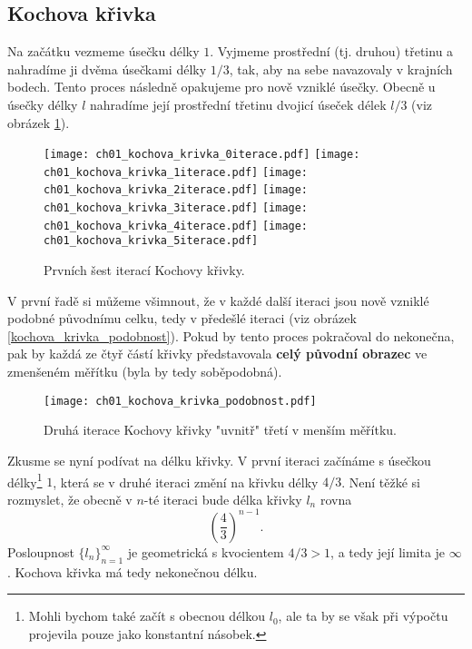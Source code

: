 \subsection{Kochova křivka}\label{subsec:kochova_krivka}
Na začátku vezmeme úsečku délky $1$. Vyjmeme prostřední (tj. druhou) třetinu a nahradíme ji dvěma úsečkami délky $1/3$, tak, aby na sebe navazovaly v krajních bodech. Tento proces následně opakujeme pro nově vzniklé úsečky. Obecně u úsečky délky $l$ nahradíme její prostřední třetinu dvojicí úseček délek $l/3$ (viz obrázek \ref{fig:kochova_krivka_6iteraci}).
\begin{figure}[h]
    \centering
    \texttt{[image: ch01\_kochova\_krivka\_0iterace.pdf]}\qquad
    \texttt{[image: ch01\_kochova\_krivka\_1iterace.pdf]}\qquad
    \texttt{[image: ch01\_kochova\_krivka\_2iterace.pdf]}\qquad
    \texttt{[image: ch01\_kochova\_krivka\_3iterace.pdf]}\qquad
    \texttt{[image: ch01\_kochova\_krivka\_4iterace.pdf]}\qquad
    \texttt{[image: ch01\_kochova\_krivka\_5iterace.pdf]}
    \caption{Prvních šest iterací Kochovy křivky.}
    \label{fig:kochova_krivka_6iteraci}
\end{figure}
V první řadě si můžeme všimnout, že v každé další iteraci jsou nově vzniklé podobné původnímu celku, tedy v předešlé iteraci (viz obrázek \ref{kochova_krivka_podobnost}). Pokud by tento proces pokračoval do nekonečna, pak by každá ze čtyř částí křivky představovala \textbf{celý původní obrazec} ve zmenšeném měřítku (byla by tedy soběpodobná).
\begin{figure}[h]
    \centering
    \texttt{[image: ch01\_kochova\_krivka\_podobnost.pdf]}
    \caption{Druhá iterace Kochovy křivky "uvnitř" třetí v menším měřítku.}
    \label{fig:kochova_krivka_podobnost}
\end{figure}
Zkusme se nyní podívat na délku křivky. V první iteraci začínáme s úsečkou délky\footnote{Mohli bychom také začít s obecnou délkou $l_0$, ale ta by se však při výpočtu projevila pouze jako konstantní násobek.} $1$, která se v druhé iteraci změní na křivku délky $4/3$. Není těžké si rozmyslet, že obecně v $n$-té iteraci bude délka křivky $l_n$ rovna
\begin{equation*}
    \left(\dfrac{4}{3}\right)^{n-1}.
\end{equation*}
Posloupnost $\{l_n\}_{n=1}^{\infty}$ je geometrická s kvocientem $4/3>1$, a tedy její limita je $\infty$. Kochova křivka má tedy nekonečnou délku.